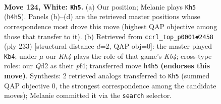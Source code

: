 \documentclass[11pt]{article}
\begin{document}
\begin{figure}[p]\centering
\begin{subfigure}{0.46\textwidth}\centering
\resizebox{\linewidth}{!}{%
\newchessgame
\chessboard[
  setfen={6k1/8/8/8/7K/8/3Q4/8 w - - 27 124},
  showmover=false,
  pgfstyle=straightmove, color=movearrow, markmove={h4-h5}
]}
\caption{}
\end{subfigure}\hfill
\begin{subfigure}{0.46\textwidth}\centering
\resizebox{\linewidth}{!}{%
\newchessgame
\chessboard[
  setfen={8/8/8/1k6/5P2/8/K7/8 b - - 5 117},
  showmover=false,
  pgfstyle=straightmove, color=movearrow, markmove={b5-b4}
]}
\caption{}
\end{subfigure}
\\[4pt]

\caption{\textbf{Move 124, White: \texttt{Kh5}.} (a) Our position; Melanie plays \texttt{Kh5} (\texttt{h4h5}). Panels (b)--(d) are the retrieved master positions whose correspondence most drove this move (highest QAP objective among those that transfer to it). (b) Retrieved from \texttt{ccrl\_top\_p0001\#2458} (ply 233) [structural distance $d$=2, QAP obj=0]: the master played \texttt{Kb4}; under $\mu$ our \emph{Kh4} plays the role of that game's \emph{Kb4}; cross-type roles: our \emph{Q}d2 as their \emph{p}f4; transferred move \texttt{h4h5} \textbf{(endorses this move)}. Synthesis: 2 retrieved analogs transferred to \texttt{Kh5} (summed QAP objective 0, the strongest correspondence among the candidate moves); Melanie committed it via the \texttt{search} selector.}
\label{fig:thought-m246}
\end{figure}

\clearpage
\end{document}
